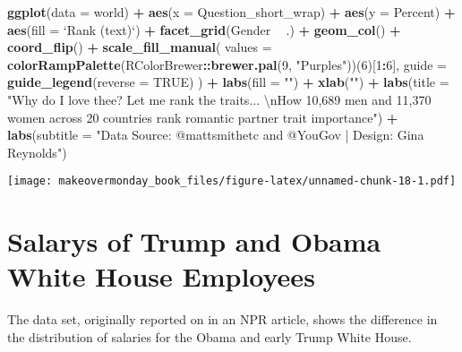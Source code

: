 \documentclass[]{book}
\newenvironment{Shaded}{\begin{snugshade}}{\end{snugshade}}
\newcommand{\KeywordTok}[1]{\textcolor[rgb]{0.13,0.29,0.53}{\textbf{#1}}}
\newcommand{\DataTypeTok}[1]{\textcolor[rgb]{0.13,0.29,0.53}{#1}}
\newcommand{\DecValTok}[1]{\textcolor[rgb]{0.00,0.00,0.81}{#1}}
\newcommand{\CharTok}[1]{\textcolor[rgb]{0.31,0.60,0.02}{#1}}
\newcommand{\StringTok}[1]{\textcolor[rgb]{0.31,0.60,0.02}{#1}}
\newcommand{\OtherTok}[1]{\textcolor[rgb]{0.56,0.35,0.01}{#1}}
\newcommand{\OperatorTok}[1]{\textcolor[rgb]{0.81,0.36,0.00}{\textbf{#1}}}
\newcommand{\NormalTok}[1]{#1}
\theoremstyle{definition}
\theoremstyle{definition}
\theoremstyle{definition}
\theoremstyle{remark}
\begin{document}
\begin{Shaded}
\begin{Highlighting}[]
\KeywordTok{ggplot}\NormalTok{(}\DataTypeTok{data =}\NormalTok{ world) }\OperatorTok{+}\StringTok{ }
\StringTok{  }\KeywordTok{aes}\NormalTok{(}\DataTypeTok{x =}\NormalTok{ Question_short_wrap) }\OperatorTok{+}
\StringTok{  }\KeywordTok{aes}\NormalTok{(}\DataTypeTok{y =}\NormalTok{ Percent) }\OperatorTok{+}
\StringTok{  }\KeywordTok{aes}\NormalTok{(}\DataTypeTok{fill =} \StringTok{`}\DataTypeTok{Rank (text)}\StringTok{`}\NormalTok{) }\OperatorTok{+}
\StringTok{  }\KeywordTok{facet_grid}\NormalTok{(Gender }\OperatorTok{~}\StringTok{ }\NormalTok{.) }\OperatorTok{+}
\StringTok{  }\KeywordTok{geom_col}\NormalTok{() }\OperatorTok{+}
\StringTok{  }\KeywordTok{coord_flip}\NormalTok{() }\OperatorTok{+}
\StringTok{  }\KeywordTok{scale_fill_manual}\NormalTok{(}
    \DataTypeTok{values =} \KeywordTok{colorRampPalette}\NormalTok{(RColorBrewer}\OperatorTok{::}\KeywordTok{brewer.pal}\NormalTok{(}\DecValTok{9}\NormalTok{, }\StringTok{"Purples"}\NormalTok{))(}\DecValTok{6}\NormalTok{)[}\DecValTok{1}\OperatorTok{:}\DecValTok{6}\NormalTok{],}
    \DataTypeTok{guide =} \KeywordTok{guide_legend}\NormalTok{(}\DataTypeTok{reverse =} \OtherTok{TRUE}\NormalTok{)}
\NormalTok{  ) }\OperatorTok{+}
\StringTok{  }\KeywordTok{labs}\NormalTok{(}\DataTypeTok{fill =} \StringTok{""}\NormalTok{) }\OperatorTok{+}
\StringTok{  }\KeywordTok{xlab}\NormalTok{(}\StringTok{""}\NormalTok{) }\OperatorTok{+}
\StringTok{  }\KeywordTok{labs}\NormalTok{(}\DataTypeTok{title =} \StringTok{"Why do I love thee?  Let me rank the traits... }\CharTok{\textbackslash{}n}\StringTok{How 10,689 men and 11,370 women across 20 countries rank romantic partner trait importance"}\NormalTok{) }\OperatorTok{+}
\StringTok{  }\KeywordTok{labs}\NormalTok{(}\DataTypeTok{subtitle =} \StringTok{"Data Source: @mattsmithetc and @YouGov | Design: Gina Reynolds"}\NormalTok{) }
\end{Highlighting}
\end{Shaded}

\texttt{[image: makeovermonday\_book\_files/figure-latex/unnamed-chunk-18-1.pdf]}

\chapter{Salarys of Trump and Obama White House
Employees}\label{salarys-of-trump-and-obama-white-house-employees}

The data set, originally reported on in an NPR article, shows the
difference in the distribution of salaries for the Obama and early Trump
White House.
\end{document}
